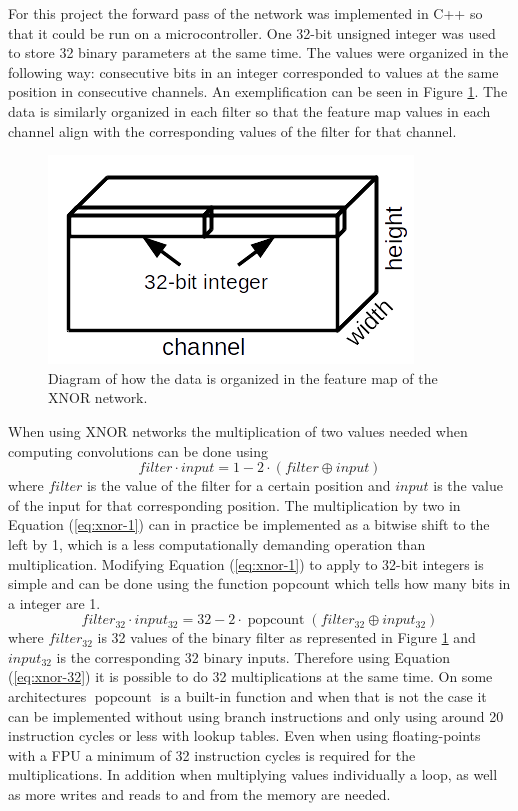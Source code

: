 \documentclass[conference]{IEEEtran}
\DeclareMathOperator{\popcount}{popcount}
\begin{document}
For this project the forward pass of the network was implemented in C++ so that it could be run on a microcontroller. One 32-bit unsigned integer was used to store 32 binary parameters at the same time. The values were organized in the following way: consecutive bits in an integer corresponded to values at the same position in consecutive channels. An exemplification can be seen in Figure \ref{fig:map}. The data is similarly organized in each filter so that the feature map values in each channel align with the corresponding values of the filter for that channel.

\begin{figure}[!t]
\centering
\includegraphics[width=0.5\columnwidth]{map}
\caption{Diagram of how the data is organized in the feature map of the XNOR network.}
\label{fig:map}
\end{figure}

When using XNOR networks the multiplication of two values needed when computing convolutions can be done using
\begin{equation}
\mathit{filter} \cdot \mathit{input} = 1 - 2 \cdot (\mathit{filter} \oplus \mathit{input})
\label{eq:xnor-1}
\end{equation}
where $\mathit{filter}$ is the value of the filter for a certain position and $\mathit{input}$ is the value of the input for that corresponding position. The multiplication by two in Equation (\ref{eq:xnor-1}) can in practice be implemented as a bitwise shift to the left by 1, which is a less computationally demanding operation than multiplication. Modifying Equation (\ref{eq:xnor-1}) to apply to 32-bit integers is simple and can be done using the function popcount which tells how many bits in a integer are 1.
\begin{equation}
\mathit{filter_{32}} \cdot \mathit{input_{32}} = 32 - 2 \cdot \popcount(\mathit{filter_{32}} \oplus \mathit{input_{32}})
\label{eq:xnor-32}
\end{equation}
where $\mathit{filter_{32}}$ is 32 values of the binary filter as represented in Figure \ref{fig:map} and $\mathit{input_{32}}$ is the corresponding 32 binary inputs. Therefore using Equation (\ref{eq:xnor-32}) it is possible to do 32 multiplications at the same time. On some architectures $\popcount$ is a built-in function and when that is not the case it can be implemented without using branch instructions and only using around 20 instruction cycles or less with lookup tables. Even when using floating-points with a FPU a minimum of 32 instruction cycles is required for the multiplications. In addition when multiplying values individually a loop, as well as more writes and reads to and from the memory are needed.
\end{document}
